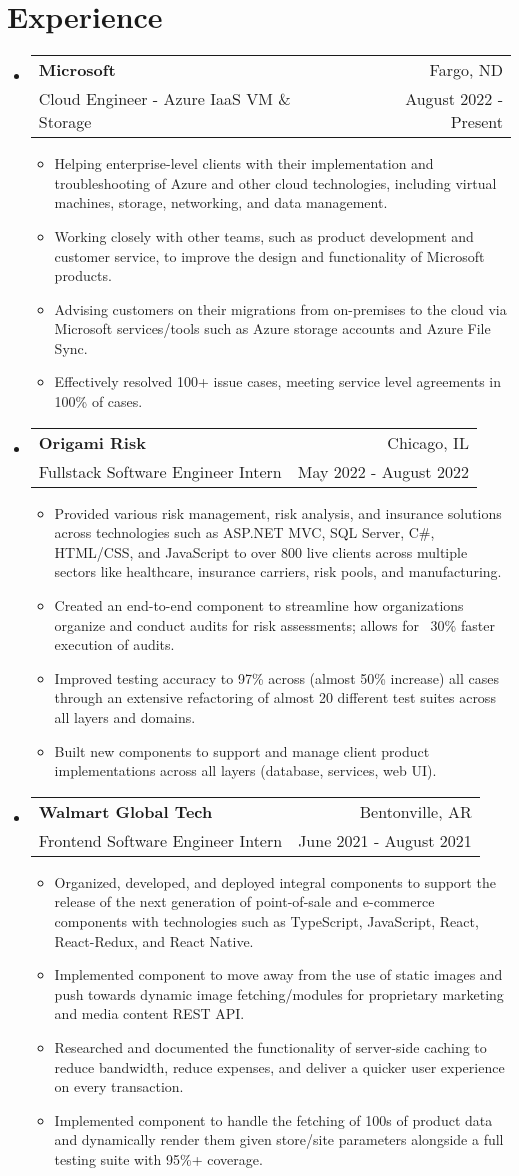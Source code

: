 \documentclass[letterpaper,10.8pt]{article}
\makeatletter
\newcommand{\resumeItems}[1]{
  \item\small{
    {#1 \vspace{-2pt}}
  }
}
\newcommand{\resumeSubheading}[4]{
  \vspace{-1pt}\item
    \begin{tabular*}{0.97\textwidth}{l@{\extracolsep{\fill}}r}
      \textbf{#1} & #2 \\
      {\small#3} & {\small #4} \\
    \end{tabular*}\vspace{-6pt}
}
\newcommand{\resumeSubHeadingListStart}{\begin{itemize}[leftmargin=*]}
\newcommand{\resumeSubHeadingListEnd}{\end{itemize}}
\newcommand{\resumeItemListStart}{\begin{itemize}}
\newcommand{\resumeItemListEnd}{\end{itemize}\vspace{-5pt}}
\makeatother
\begin{document}
\section{Experience}
  \resumeSubHeadingListStart
  \resumeSubheading
    {Microsoft}{Fargo, ND}
    {Cloud Engineer - Azure IaaS VM \& Storage}{August 2022 - Present}
        \resumeItemListStart
            \resumeItems{Helping enterprise-level clients with their implementation and troubleshooting of Azure and other cloud technologies, including virtual machines, storage, networking, and data management.}
            \resumeItems{Working closely with other teams, such as product development and customer service, to improve the design and functionality of Microsoft products.}
            \resumeItems{Advising customers on their migrations from on-premises to the cloud via Microsoft services/tools such as Azure storage accounts and Azure File Sync.}
            \resumeItems{Effectively resolved 100+ issue cases, meeting service level agreements in 100\% of cases.}
        \resumeItemListEnd
    \resumeSubheading
    {Origami Risk}{Chicago, IL}
    {Fullstack Software Engineer Intern}{May 2022 - August 2022}
        \resumeItemListStart
            \resumeItems{
            Provided various risk management, risk analysis, and insurance solutions across technologies such as ASP.NET MVC, SQL Server, C\#, HTML/CSS, and JavaScript to over 800 live clients across multiple sectors like healthcare, insurance carriers, risk pools, and manufacturing.}
            \resumeItems{Created an end-to-end component to streamline how organizations organize and conduct audits for risk assessments; allows for ~30\% faster execution of audits.}
            \resumeItems{Improved testing accuracy to 97\% across (almost 50\% increase) all cases through an extensive refactoring of almost 20 different test suites across all layers and domains.
            }
            \resumeItems{Built new components to support and manage client product implementations across all layers (database, services, web UI).}
        \resumeItemListEnd
    \resumeSubheading
    {Walmart Global Tech}{Bentonville, AR}
    {Frontend Software Engineer Intern}{June 2021 - August 2021}
        \resumeItemListStart
            \resumeItems{Organized, developed, and deployed integral components to support the release of the next
generation of point-of-sale and e-commerce components with technologies such as TypeScript, JavaScript, React, React-Redux, and React Native.}
            \resumeItems{Implemented component to move away from the use of static images and push towards dynamic image fetching/modules for proprietary marketing and media content REST API.}
            \resumeItems{Researched and documented the functionality of server-side caching to reduce bandwidth, reduce expenses, and deliver a quicker user experience on every transaction.}
            \resumeItems{Implemented component to handle the fetching of 100s of product data and dynamically render them
given store/site parameters alongside a full testing suite with 95\%+ coverage.}
        \resumeItemListEnd
\resumeSubHeadingListEnd
\end{document}
